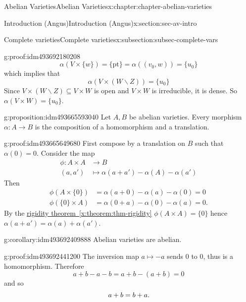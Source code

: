 \documentclass[oneside,10pt,]{book}
\newcommand{\qedhere}{\relax}
\numberwithin{equation}{section}
\newcommand{\amp}{&}
\begin{document}
\begin{chapterptx}{Abelian Varieties}{}{Abelian Varieties}{}{}{x:chapter:chapter-abelian-varieties}
\begin{sectionptx}{Introduction (Angus)}{}{Introduction (Angus)}{}{}{x:section:sec-av-intro}
\begin{subsectionptx}{Complete varieties}{}{Complete varieties}{}{}{x:subsection:subsec-complete-vars}
\begin{proofptx}{}{g:proof:idm493692180208}
\begin{equation*}
\alpha(V\times \{w\}) = \{\text{pt}\} = \alpha((v_0,w)) = \{u_0\}
\end{equation*}
which implies that%
\begin{equation*}
\alpha(V\times (W\smallsetminus Z)) = \{u_0\}
\end{equation*}
Since \(V\times (W\smallsetminus Z) \subseteq V\times W\) is open and \(V\times W\) is irreducible, it is dense. So \(\alpha(V\times W) = \{u_0\}\).%
\end{proofptx}
\begin{proposition}{}{}{g:proposition:idm493665593040}%
Let \(A,B\) be abelian varieties. Every morphism \(\alpha \colon A \to B \) is the composition of a homomorphism and a translation.%
\end{proposition}
\begin{proofptx}{}{g:proof:idm493665649680}
First compose by a translation on \(B\) such that \(\alpha(0) = 0\). Consider the map%
\begin{align*}
\phi \colon A\times A\amp\to B\\
(a,a')               \amp\mapsto \alpha(a+a') - \alpha(A) -\alpha(a')
\end{align*}
Then%
\begin{align*}
\phi(A\times\{0\}) \amp = \alpha(a+ 0) - \alpha(a) - \alpha(0) = 0\\
\phi(\{0\}\times A) \amp = \alpha(0+ a) - \alpha(0) - \alpha(a) = 0\text{.}
\end{align*}
By the \hyperref[x:theorem:thm-rigidity]{rigidity theorem~\ref{x:theorem:thm-rigidity}} \(\phi(A\times A) = \{0\}\) hence \(\alpha(a + a') = \alpha(a) + \alpha(a')\).%
\end{proofptx}
\begin{corollary}{}{}{g:corollary:idm493692409888}%
Abelian varieties are abelian.%
\end{corollary}
\begin{proofptx}{}{g:proof:idm493692441200}
The inversion map \(a \mapsto -a\) sends \(0\) to \(0\), thus is a homomorphism. Therefore%
\begin{equation*}
a+ b - a -b = a+b -(a+b) = 0
\end{equation*}
and so%
\begin{equation*}
a+b=b+a\text{.}\qedhere
\end{equation*}
%
\end{proofptx}
\end{subsectionptx}
\end{sectionptx}

\end{chapterptx}
\end{document}
